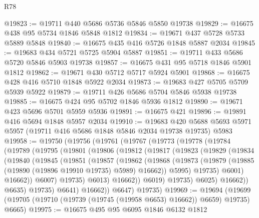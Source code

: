 \begin{lexlean}{R78}
\begin{coremodule}
@19823 := @19711 @440 @5686 @5736 @5846 @5850 @19738
@19829 := @16675 @438 @95 @5734 @1846 @5848 @1812
@19834 := @19671 @437 @5728 @5733 @5889 @5848
@19840 := @16675 @435 @416 @5726 @1848 @5887 @2034
@19845 := @19683 @434 @5721 @5725 @5904 @5887
@19851 := @19711 @433 @5686 @5720 @5846 @5903 @19738
@19857 := @16675 @431 @95 @5718 @1846 @5901 @1812
@19862 := @19671 @430 @5712 @5717 @5924 @5901
@19868 := @16675 @428 @416 @5710 @1848 @5922 @2034
@19873 := @19683 @427 @5705 @5709 @5939 @5922
@19879 := @19711 @426 @5686 @5704 @5846 @5938 @19738
@19885 := @16675 @424 @95 @5702 @1846 @5936 @1812
@19890 := @19671 @423 @5696 @5701 @5959 @5936
@19891 := @16675 @421
@19896 := @19891 @416 @5694 @1848 @5957 @2034
@19910 := @19683
    @420
    @5688
    @5693
    @5971
    @5957
    (@19711 @416 @5686 @1848 @5846 @2034 @19738 @19735)
    @5983
@19958 := @19750
    (@19756
      (@19761
        (@19767
          (@19773
            (@19778
              (@19784
                (@19789
                  (@19795
                    (@19801
                      (@19806
                        (@19812
                          (@19817
                            (@19823
                              (@19829
                                (@19834
                                  (@19840
                                    (@19845
                                      (@19851
                                        (@19857
                                          (@19862
                                            (@19868
                                              (@19873
                                                (@19879
                                                  (@19885
                                                    (@19890 (@19896 @19910 @19735) @5989)
                                                    @16662))
                                                @5995)
                                              @19735)
                                            @6001)
                                          @16662))
                                      @6007)
                                    @19735)
                                  @6013)
                                @16662))
                            @6019)
                          @19735)
                        @6025)
                      @16662))
                  @6635)
                @19735)
              @6641)
            @16662))
        @6647)
      @19735)
@19969 := @19694
    (@19699 (@19705 (@19710 (@19739 (@19745 (@19958 @6653) @16662)) @6659) @19735) @6665)
@19975 := @16675 @495 @95 @6095 @1846 @6132 @1812

\end{coremodule}
\end{lexlean}
